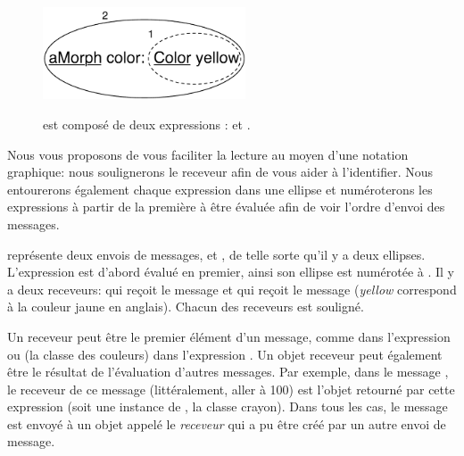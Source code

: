 \documentclass[a4paper,10pt,twoside]{book}
\begin{document}
\begin{figure}[htb]
\begin{minipage}{0.43\textwidth}
\begin{center}
		{\includegraphics[width=6cm]{uKeyUnOne}}
	\caption{ est composé de deux expressions :  et .}
	\end{center}
\end{minipage}
\end{figure}



Nous vous proposons de vous faciliter la lecture au moyen d'une
notation graphique: nous soulignerons le receveur afin de vous aider
à l'identifier. Nous entourerons également chaque expression dans
une ellipse et numéroterons les expressions à partir de la
première à être évaluée afin de voir l'ordre d'envoi des messages.


 représente deux envois de messages,  et , de telle sorte qu'il y a
deux ellipses. L'expression  est d'abord évalué
en premier, ainsi son ellipse est numérotée à . Il y a
deux receveurs:  qui reçoit le message 
et  qui reçoit le message  
(\emph{yellow} correspond à la couleur jaune en anglais). 
Chacun des receveurs est souligné.

Un receveur peut être le premier élément d'un message, comme
 dans l'expression  ou  
(la classe des couleurs)
dans l'expression . Un objet receveur peut
également être le résultat de l'évaluation d'autres
messages. Par exemple, dans le message , le
receveur de ce message  
(littéralement, aller à 100)
est l'objet retourné par cette expression  
(soit une instance de , la classe crayon). Dans tous les cas,
le message est envoyé à un objet appelé le \emph{receveur} qui a
pu être créé par un autre envoi de message.
\end{document}

